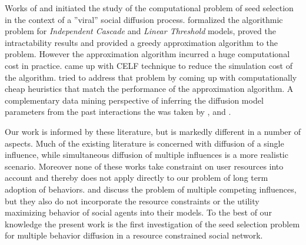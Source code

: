 \documentclass[letterpaper]{article}
\theoremstyle{plain} 		\newtheorem{thm}{Theorem}[section]
\theoremstyle{definition} 	\newtheorem{defn}[thm]{Definition}
\theoremstyle{remark}		\newtheorem{rem}{Remark}
\begin{document}
Works of \cite{Domingos02} and \cite{Kempe03} initiated the study of the computational problem of seed selection in the context of a ''viral'' social diffusion process. \cite{Kempe03} formalized the algorithmic problem for \textit{Independent Cascade} and \textit{Linear Threshold} models, proved the intractability results and provided a greedy approximation algorithm to the problem. However the approximation algorithm incurred a huge computational cost in practice. \cite{Leskovec07} came up with CELF technique to reduce the simulation cost of the algorithm. \cite{Chen09} tried to address that problem by coming up with computationally cheap heuristics that match the performance of the approximation algorithm. A complementary data mining perspective of inferring the diffusion model parameters from the past interactions the was taken by \cite{Saito08}, \cite{Goyal10} and \cite{Mathioudakis11}. 

Our work is informed by these literature, but is markedly different in a number of aspects. Much of the existing literature is concerned with diffusion of a single influence, while simultaneous diffusion of multiple influences is a more realistic scenario. Moreover none of these works take constraint on user resources into account and thereby does not apply directly to our problem of long term adoption of behaviors. \cite{Bharathi07} and \cite{Carnes07} discuss the problem of multiple competing influences, but they also do not incorporate the resource constraints or the utility maximizing behavior of social agents into their models. To the best of our knowledge the present work is the first investigation of the seed selection problem for multiple behavior diffusion in a resource constrained social network.
\end{document}
